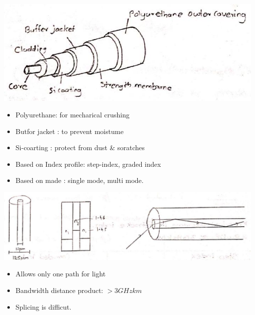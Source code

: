 \documentclass[12pt, a4paper]{article}
\begin{document}

\begin{center}
	\includegraphics[max width=\textwidth]{2024_06_16_30d750483617f1939202g-05(2)}
\end{center}

\begin{itemize}
	\item Polyurethane: for mecharical crushing
	\item Butfor jacket : to prevent moistume
	\item Si-coarting : protect from dust \& soratches
\end{itemize}


\begin{itemize}
	\item Based on Index profile: step-index, graded index
	\item Based on made : single mode, multi mode.
\end{itemize}


\begin{center}
	\includegraphics[max width=\textwidth]{2024_06_16_30d750483617f1939202g-05(1)}
\end{center}

\begin{itemize}
	\item Allows only one path for light
	\item Bandwidth distance product: $>3 \unit{GHzkm}$
	\item Splicing is difficut.
\end{itemize}
\end{document}

